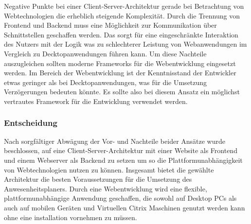 Negative Punkte bei einer Client-Server-Architektur gerade bei Betrachtung von Webtechnologien die erheblich steigende Komplexität. Durch die Trennung von Frontend und Backend muss eine Möglichkeit zur Kommunikation über Schnittstellen geschaffen werden. Das sorgt für eine eingeschränkte Interaktion des Nutzers mit der Logik was zu schlechterer Leistung von Webanwendungen im Vergleich zu Decktopanwendungen führen kann. Um diese Nachteile auszugleichen sollten moderne Frameworks für die Webentwicklung eingesetzt werden. Im Bereich der Webentwicklung ist der Kenntnisstand der Entwickler etwas geringer als bei Decktopanwendungen, was für die Umsetzung Verzögerungen bedeuten könnte. Es sollte also bei diesem Ansatz ein möglichst vertrautes Framework für die Entwicklung verwendet werden.

\subsubsection{Entscheidung}
\label{sec:Entscheidung}
Nach sorgfältiger Abwägung der Vor- und Nachteile beider Ansätze wurde beschlossen, auf eine Client-Server-Architektur mit einer Website als Frontend und einem Webserver als Backend zu setzen um so die Plattformunabhängigkeit von Webtechnologien nutzen zu können. Insgesamt bietet die gewählte Architektur die besten Voraussetzungen für die Umsetzung des Anwesenheitsplaners. Durch eine Webentwicklung wird eine flexible, plattformunabhängige Anwendung geschaffen, die sowohl auf Desktop PCs als auch auf mobilen Geräten und Virtuellen Citrix Maschinen genutzt werden kann ohne eine installation vornehmen zu müssen.




